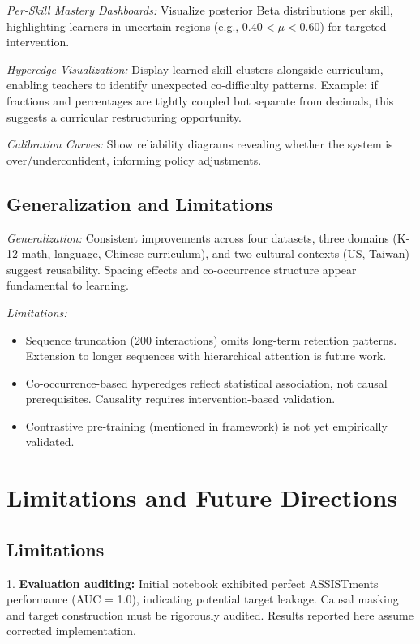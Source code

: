 \documentclass[preprint,12pt]{elsarticle}
\begin{document}
\textit{Per-Skill Mastery Dashboards:} Visualize posterior Beta distributions per skill, highlighting learners in uncertain regions (e.g., $0.40 < \mu < 0.60$) for targeted intervention.

\textit{Hyperedge Visualization:} Display learned skill clusters alongside curriculum, enabling teachers to identify unexpected co-difficulty patterns. Example: if fractions and percentages are tightly coupled but separate from decimals, this suggests a curricular restructuring opportunity.

\textit{Calibration Curves:} Show reliability diagrams revealing whether the system is over/underconfident, informing policy adjustments.

\subsection{Generalization and Limitations}

\textit{Generalization:} Consistent improvements across four datasets, three domains (K-12 math, language, Chinese curriculum), and two cultural contexts (US, Taiwan) suggest reusability. Spacing effects and co-occurrence structure appear fundamental to learning.

\textit{Limitations:}
\begin{itemize}
\item Sequence truncation (200 interactions) omits long-term retention patterns. Extension to longer sequences with hierarchical attention is future work.
\item Co-occurrence-based hyperedges reflect statistical association, not causal prerequisites. Causality requires intervention-based validation.
\item Contrastive pre-training (mentioned in framework) is not yet empirically validated.
\end{itemize}

\section{Limitations and Future Directions}\label{sec:limitations}

\subsection{Limitations}

1. \textbf{Evaluation auditing:} Initial notebook exhibited perfect ASSISTments performance (AUC = 1.0), indicating potential target leakage. Causal masking and target construction must be rigorously audited. Results reported here assume corrected implementation.
\end{document}

